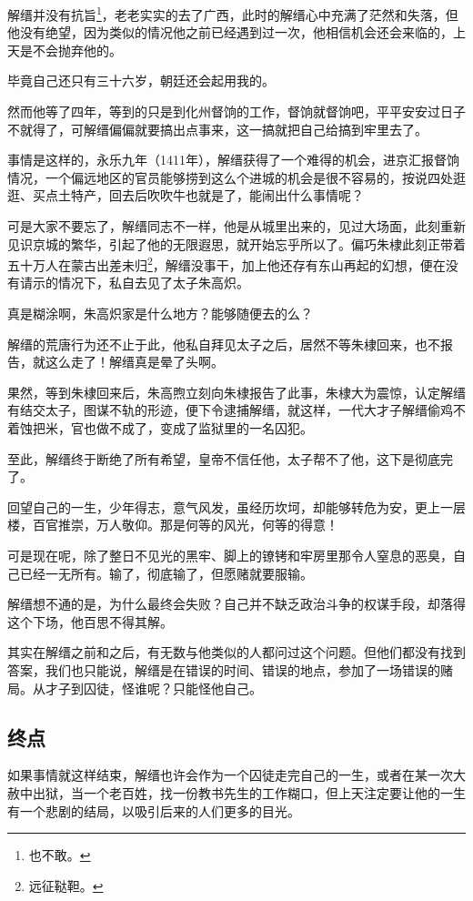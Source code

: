 \begin{multicols}{\theparacolNo}
解缙并没有抗旨\footnote{也不敢。}，老老实实的去了广西，此时的解缙心中充满了茫然和失落，但他没有绝望，因为类似的情况他之前已经遇到过一次，他相信机会还会来临的，上天是不会抛弃他的。

毕竟自己还只有三十六岁，朝廷还会起用我的。

然而他等了四年，等到的只是到化州督饷的工作，督饷就督饷吧，平平安安过日子不就得了，可解缙偏偏就要搞出点事来，这一搞就把自己给搞到牢里去了。

事情是这样的，永乐九年（1411年），解缙获得了一个难得的机会，进京汇报督饷情况，一个偏远地区的官员能够捞到这么个进城的机会是很不容易的，按说四处逛逛、买点土特产，回去后吹吹牛也就是了，能闹出什么事情呢？

可是大家不要忘了，解缙同志不一样，他是从城里出来的，见过大场面，此刻重新见识京城的繁华，引起了他的无限遐思，就开始忘乎所以了。偏巧朱棣此刻正带着五十万人在蒙古出差未归\footnote{远征鞑靼。}，解缙没事干，加上他还存有东山再起的幻想，便在没有请示的情况下，私自去见了太子朱高炽。

真是糊涂啊，朱高炽家是什么地方？能够随便去的么？

解缙的荒唐行为还不止于此，他私自拜见太子之后，居然不等朱棣回来，也不报告，就这么走了！解缙真是晕了头啊。

果然，等到朱棣回来后，朱高煦立刻向朱棣报告了此事，朱棣大为震惊，认定解缙有结交太子，图谋不轨的形迹，便下令逮捕解缙，就这样，一代大才子解缙偷鸡不着蚀把米，官也做不成了，变成了监狱里的一名囚犯。

至此，解缙终于断绝了所有希望，皇帝不信任他，太子帮不了他，这下是彻底完了。

回望自己的一生，少年得志，意气风发，虽经历坎坷，却能够转危为安，更上一层楼，百官推崇，万人敬仰。那是何等的风光，何等的得意！

可是现在呢，除了整日不见光的黑牢、脚上的镣铐和牢房里那令人窒息的恶臭，自己已经一无所有。输了，彻底输了，但愿赌就要服输。

解缙想不通的是，为什么最终会失败？自己并不缺乏政治斗争的权谋手段，却落得这个下场，他百思不得其解。

其实在解缙之前和之后，有无数与他类似的人都问过这个问题。但他们都没有找到答案，我们也只能说，解缙是在错误的时间、错误的地点，参加了一场错误的赌局。从才子到囚徒，怪谁呢？只能怪他自己。

\subsection{终点}
如果事情就这样结束，解缙也许会作为一个囚徒走完自己的一生，或者在某一次大赦中出狱，当一个老百姓，找一份教书先生的工作糊口，但上天注定要让他的一生有一个悲剧的结局，以吸引后来的人们更多的目光。


\end{multicols}
